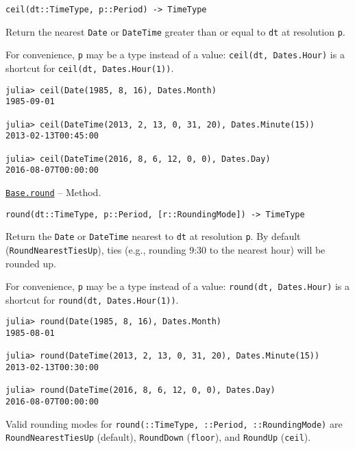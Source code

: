 \begin{adjustwidth}{2em}{0pt}


\begin{verbatim}
ceil(dt::TimeType, p::Period) -> TimeType
\end{verbatim}

Return the nearest \texttt{Date} or \texttt{DateTime} greater than or equal to \texttt{dt} at resolution \texttt{p}.

For convenience, \texttt{p} may be a type instead of a value: \texttt{ceil(dt, Dates.Hour)} is a shortcut for \texttt{ceil(dt, Dates.Hour(1))}.


\begin{verbatim}
julia> ceil(Date(1985, 8, 16), Dates.Month)
1985-09-01

julia> ceil(DateTime(2013, 2, 13, 0, 31, 20), Dates.Minute(15))
2013-02-13T00:45:00

julia> ceil(DateTime(2016, 8, 6, 12, 0, 0), Dates.Day)
2016-08-07T00:00:00
\end{verbatim}



\end{adjustwidth}
\hypertarget{325762679635971237}{}
\hyperlink{325762679635971237}{\texttt{Base.round}}  -- {Method.}

\begin{adjustwidth}{2em}{0pt}


\begin{verbatim}
round(dt::TimeType, p::Period, [r::RoundingMode]) -> TimeType
\end{verbatim}

Return the \texttt{Date} or \texttt{DateTime} nearest to \texttt{dt} at resolution \texttt{p}. By default (\texttt{RoundNearestTiesUp}), ties (e.g., rounding 9:30 to the nearest hour) will be rounded up.

For convenience, \texttt{p} may be a type instead of a value: \texttt{round(dt, Dates.Hour)} is a shortcut for \texttt{round(dt, Dates.Hour(1))}.


\begin{verbatim}
julia> round(Date(1985, 8, 16), Dates.Month)
1985-08-01

julia> round(DateTime(2013, 2, 13, 0, 31, 20), Dates.Minute(15))
2013-02-13T00:30:00

julia> round(DateTime(2016, 8, 6, 12, 0, 0), Dates.Day)
2016-08-07T00:00:00
\end{verbatim}

Valid rounding modes for \texttt{round(::TimeType, ::Period, ::RoundingMode)} are \texttt{RoundNearestTiesUp} (default), \texttt{RoundDown} (\texttt{floor}), and \texttt{RoundUp} (\texttt{ceil}).



\end{adjustwidth}

